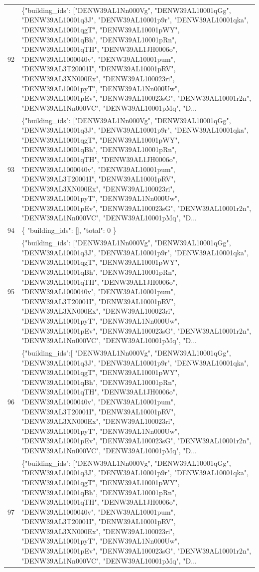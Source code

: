 \documentclass[a4paper,11pt]{article}
\begin{document}
\begin{table}[ht]
\begin{tabular}{r p{12cm}}
92 & \{"building\_ids": ["DENW39AL1Nn000Vg", "DENW39AL10001qGg", "DENW39AL10001q3J", "DENW39AL10001p9r", "DENW39AL10001qka", "DENW39AL10001qgT", "DENW39AL10001pWY", "DENW39AL10001qBh", "DENW39AL10001pRn", "DENW39AL10001qTH", "DENW39AL1JH0006o", "DENW39AL1000040v", "DENW39AL10001pum", "DENW39AL3T20001I", "DENW39AL10001pRV", "DENW39AL3XN000Ex", "DENW39AL100023ri", "DENW39AL10001pyT", "DENW39AL1Nn000Uw", "DENW39AL10001pEv", "DENW39AL100023sG", "DENW39AL10001r2n", "DENW39AL1Nn000VC", "DENW39AL10001pMq", "D... \\
93 & \{"building\_ids": ["DENW39AL1Nn000Vg", "DENW39AL10001qGg", "DENW39AL10001q3J", "DENW39AL10001p9r", "DENW39AL10001qka", "DENW39AL10001qgT", "DENW39AL10001pWY", "DENW39AL10001qBh", "DENW39AL10001pRn", "DENW39AL10001qTH", "DENW39AL1JH0006o", "DENW39AL1000040v", "DENW39AL10001pum", "DENW39AL3T20001I", "DENW39AL10001pRV", "DENW39AL3XN000Ex", "DENW39AL100023ri", "DENW39AL10001pyT", "DENW39AL1Nn000Uw", "DENW39AL10001pEv", "DENW39AL100023sG", "DENW39AL10001r2n", "DENW39AL1Nn000VC", "DENW39AL10001pMq", "D... \\
94 & \{
  "building\_ids": [],
  "total": 0
\} \\
95 & \{"building\_ids": ["DENW39AL1Nn000Vg", "DENW39AL10001qGg", "DENW39AL10001q3J", "DENW39AL10001p9r", "DENW39AL10001qka", "DENW39AL10001qgT", "DENW39AL10001pWY", "DENW39AL10001qBh", "DENW39AL10001pRn", "DENW39AL10001qTH", "DENW39AL1JH0006o", "DENW39AL1000040v", "DENW39AL10001pum", "DENW39AL3T20001I", "DENW39AL10001pRV", "DENW39AL3XN000Ex", "DENW39AL100023ri", "DENW39AL10001pyT", "DENW39AL1Nn000Uw", "DENW39AL10001pEv", "DENW39AL100023sG", "DENW39AL10001r2n", "DENW39AL1Nn000VC", "DENW39AL10001pMq", "D... \\
96 & \{"building\_ids":[ "DENW39AL1Nn000Vg", "DENW39AL10001qGg", "DENW39AL10001q3J", "DENW39AL10001p9r", "DENW39AL10001qka", "DENW39AL10001qgT", "DENW39AL10001pWY", "DENW39AL10001qBh", "DENW39AL10001pRn", "DENW39AL10001qTH", "DENW39AL1JH0006o", "DENW39AL1000040v", "DENW39AL10001pum", "DENW39AL3T20001I", "DENW39AL10001pRV", "DENW39AL3XN000Ex", "DENW39AL100023ri", "DENW39AL10001pyT", "DENW39AL1Nn000Uw", "DENW39AL10001pEv", "DENW39AL100023sG", "DENW39AL10001r2n", "DENW39AL1Nn000VC", "DENW39AL10001pMq", "D... \\
97 & \{"building\_ids": ["DENW39AL1Nn000Vg", "DENW39AL10001qGg", "DENW39AL10001q3J", "DENW39AL10001p9r", "DENW39AL10001qka", "DENW39AL10001qgT", "DENW39AL10001pWY", "DENW39AL10001qBh", "DENW39AL10001pRn", "DENW39AL10001qTH", "DENW39AL1JH0006o", "DENW39AL1000040v", "DENW39AL10001pum", "DENW39AL3T20001I", "DENW39AL10001pRV", "DENW39AL3XN000Ex", "DENW39AL100023ri", "DENW39AL10001pyT", "DENW39AL1Nn000Uw", "DENW39AL10001pEv", "DENW39AL100023sG", "DENW39AL10001r2n", "DENW39AL1Nn000VC", "DENW39AL10001pMq", "D... \\

\end{tabular}
\end{table}
\end{document}
